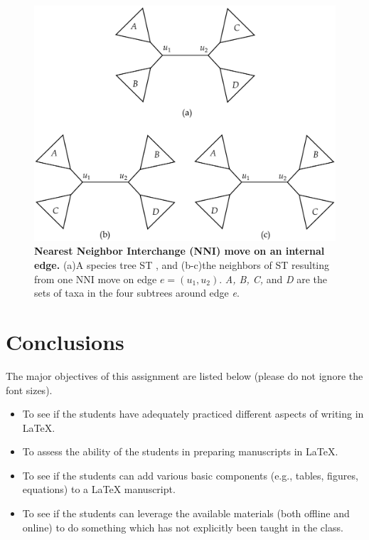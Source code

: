 \documentclass[12pt, a4paper]{article}
\begin{document}
    
	\begin{figure}[t]
		\centering
		\includegraphics[scale=0.35]{Figure3.pdf}
		\caption{\textbf{Nearest Neighbor Interchange (NNI) move on an internal edge.}
			(a)A species tree ST , and 
			(b-c)the neighbors of ST resulting from one NNI move on edge
			$e = (u_1 , u_2 )$. \textit{A, B, C,} and \textit{D} are the sets of taxa in the four subtrees around edge \textit{e}.}
		
		\label{fig:1}
	\end{figure}
	\section{Conclusions}
	The major objectives of this assignment are listed below (please do not ignore the font
	sizes).
	\begin{itemize}
		\item\Huge{To see if the students have adequately practiced different aspects of
			writing in \LaTeX.}
		\item\Large{To assess the ability of the students in preparing manuscripts
			in \LaTeX.}
		\item\normalsize {To see if the students can add various basic components (e.g., tables, figures, equations) to a {\LaTeX}  manuscript.}
		\item To see if the students can leverage the available materials (both offline and online) to do
		something which has not explicitly been taught in the class.
	\end{itemize}
	
\end{document}
